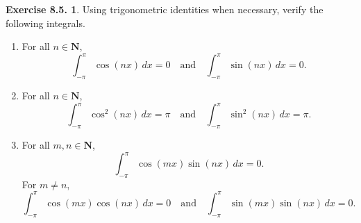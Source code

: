 \documentclass[12pt]{article}
\theoremstyle{definition}
\theoremstyle{exercise}
\newtheorem{exercise}{Exercise 8.5.}
\theoremstyle{solution}
\newcommand{\quand}{\quad \text{and} \quad}
\newcommand{\N}{\mathbf{N}}
\begin{document}
\begin{exercise}
\label{ex:2}
    Using trigonometric identities when necessary, verify the following integrals.
    \begin{enumerate}
        \item For all \( n \in \N \),
        \[
            \int_{-\pi}^{\pi} \cos (nx) \, dx = 0 \quand \int_{-\pi}^{\pi} \sin (nx) \, dx = 0.
        \]

        \item For all \( n \in \N \),
        \[
            \int_{-\pi}^{\pi} \cos^2 (nx) \, dx = \pi \quand \int_{-\pi}^{\pi} \sin^2 (nx) \, dx = \pi.
        \]
        
        \item For all \( m, n \in \N \),
        \[
            \int_{-\pi}^{\pi} \cos (mx) \sin (nx) \, dx = 0.
        \]
        For \( m \neq n \),
        \[
            \int_{-\pi}^{\pi} \cos (mx) \cos (nx) \, dx = 0 \quand \int_{-\pi}^{\pi} \sin (mx) \sin (nx) \, dx = 0.
        \]
    \end{enumerate}
\end{exercise}
\end{document}
